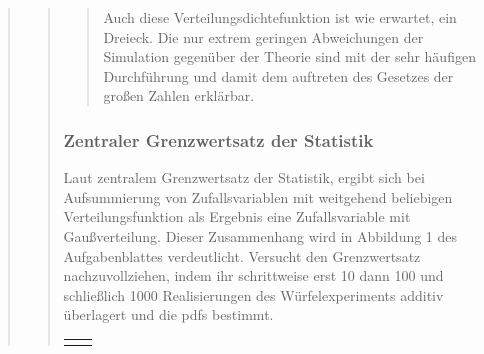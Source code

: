 \begin{quote}
\begin{quote}
\begin{quote}
            Auch diese Verteilungsdichtefunktion ist wie erwartet, ein Dreieck. Die nur extrem geringen Abweichungen der
            Simulation gegenüber der Theorie sind mit der sehr häufigen Durchführung und damit dem auftreten des Gesetzes der
            großen Zahlen erklärbar.
            
        \end{quote}
        
        
        
        \subsubsection{Zentraler Grenzwertsatz der Statistik}
        Laut zentralem Grenzwertsatz der Statistik, ergibt sich bei Aufsummierung von Zufallsvariablen mit
        weitgehend beliebigen Verteilungsfunktion als Ergebnis eine Zufallsvariable mit Gaußverteilung.
        Dieser Zusammenhang wird in Abbildung 1 des Aufgabenblattes verdeutlicht. Versucht den Grenzwertsatz nachzuvollziehen,
        indem ihr schrittweise erst 10 dann 100 und schließlich 1000 Realisierungen des Würfelexperiments additiv überlagert und die pdfs bestimmt.
        
        
        \begin{center}
        \begin{tabular}{ll}
        
        \hspace{-5cm}
            \begin{minipage}{0.6\textwidth}
                

\end{minipage}
\end{tabular}
\end{center}
\end{quote}
\end{quote}
